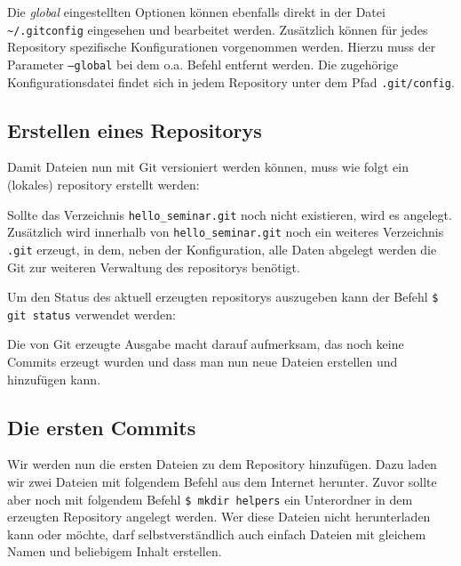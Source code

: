 Die \textit{global} eingestellten Optionen können ebenfalls direkt in der Datei
\texttt{\textasciitilde/.gitconfig} eingesehen und bearbeitet werden.
Zusätzlich können für jedes Repository spezifische Konfigurationen vorgenommen
werden. Hierzu muss der Parameter \texttt{--global} bei dem o.a. Befehl
entfernt werden. Die zugehörige Konfigurationsdatei findet sich in jedem
Repository unter dem Pfad \texttt{.git/config}.

\subsection{Erstellen eines Repositorys}\label{startup}
Damit Dateien nun mit Git versioniert werden können, muss wie folgt ein
(lokales) \gls{repository} erstellt werden:



Sollte das Verzeichnis \texttt{hello\_seminar.git} noch nicht existieren, wird
es angelegt. Zusätzlich wird innerhalb von \texttt{hello\_seminar.git} noch ein
weiteres Verzeichnis \texttt{.git} erzeugt, in dem, neben der Konfiguration,
alle Daten abgelegt werden die Git zur weiteren Verwaltung des \glspl{repository}
benötigt.

Um den Status des aktuell erzeugten \glspl{repository} auszugeben kann der
Befehl \texttt{\$ git status} verwendet werden:



Die von Git erzeugte Ausgabe macht darauf aufmerksam, das noch keine Commits
erzeugt wurden und dass man nun neue Dateien erstellen und hinzufügen kann.

\subsection{Die ersten Commits}\label{sec:first_commits}

Wir werden nun die ersten Dateien zu dem Repository hinzufügen. Dazu laden wir
zwei Dateien mit folgendem Befehl aus dem Internet herunter. Zuvor sollte aber
noch mit folgendem Befehl \texttt{\$ mkdir helpers} ein Unterordner in dem
erzeugten Repository angelegt werden. Wer diese Dateien nicht herunterladen
kann oder möchte, darf selbstverständlich auch einfach Dateien mit gleichem
Namen und beliebigem Inhalt erstellen.

